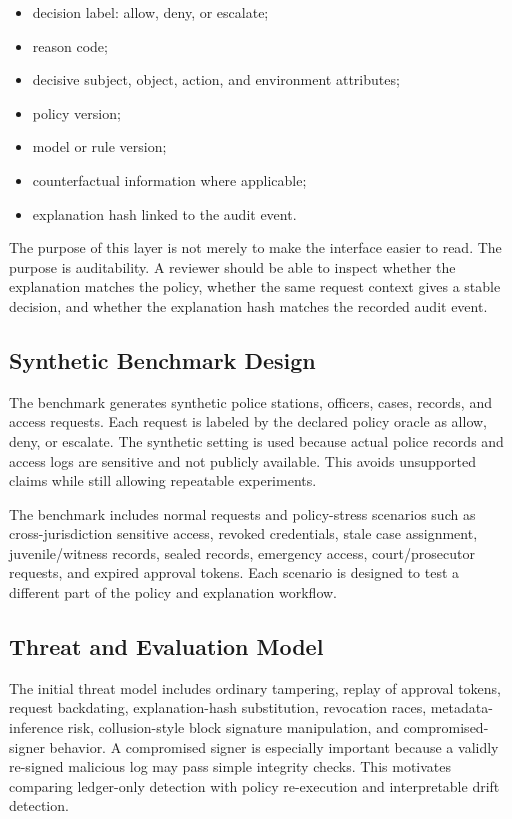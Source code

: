 \begin{itemize}
    \item decision label: allow, deny, or escalate;
    \item reason code;
    \item decisive subject, object, action, and environment attributes;
    \item policy version;
    \item model or rule version;
    \item counterfactual information where applicable;
    \item explanation hash linked to the audit event.
\end{itemize}

The purpose of this layer is not merely to make the interface easier to read. The purpose is auditability. A reviewer should be able to inspect whether the explanation matches the policy, whether the same request context gives a stable decision, and whether the explanation hash matches the recorded audit event.

\subsection{Synthetic Benchmark Design}

The benchmark generates synthetic police stations, officers, cases, records, and access requests. Each request is labeled by the declared policy oracle as allow, deny, or escalate. The synthetic setting is used because actual police records and access logs are sensitive and not publicly available. This avoids unsupported claims while still allowing repeatable experiments.

The benchmark includes normal requests and policy-stress scenarios such as cross-jurisdiction sensitive access, revoked credentials, stale case assignment, juvenile/witness records, sealed records, emergency access, court/prosecutor requests, and expired approval tokens. Each scenario is designed to test a different part of the policy and explanation workflow.

\subsection{Threat and Evaluation Model}

The initial threat model includes ordinary tampering, replay of approval tokens, request backdating, explanation-hash substitution, revocation races, metadata-inference risk, collusion-style block signature manipulation, and compromised-signer behavior. A compromised signer is especially important because a validly re-signed malicious log may pass simple integrity checks. This motivates comparing ledger-only detection with policy re-execution and interpretable drift detection.

